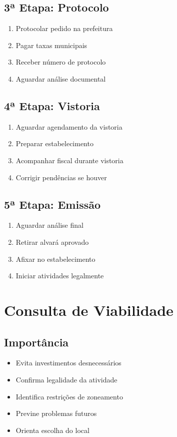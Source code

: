 \documentclass[12pt,a4paper]{article}
\begin{document}
\subsection{3ª Etapa: Protocolo}
\begin{enumerate}
    \item Protocolar pedido na prefeitura
    \item Pagar taxas municipais
    \item Receber número de protocolo
    \item Aguardar análise documental
\end{enumerate}

\subsection{4ª Etapa: Vistoria}
\begin{enumerate}
    \item Aguardar agendamento da vistoria
    \item Preparar estabelecimento
    \item Acompanhar fiscal durante vistoria
    \item Corrigir pendências se houver
\end{enumerate}

\subsection{5ª Etapa: Emissão}
\begin{enumerate}
    \item Aguardar análise final
    \item Retirar alvará aprovado
    \item Afixar no estabelecimento
    \item Iniciar atividades legalmente
\end{enumerate}

\section{Consulta de Viabilidade}

\subsection{Importância}
\begin{itemize}
    \item Evita investimentos desnecessários
    \item Confirma legalidade da atividade
    \item Identifica restrições de zoneamento
    \item Previne problemas futuros
    \item Orienta escolha do local
\end{itemize}
\end{document}
